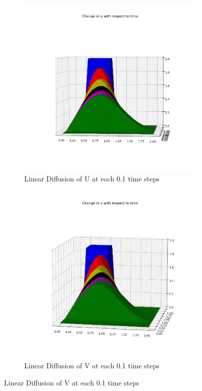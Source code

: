 \documentclass[conf]{new-aiaa}
\begin{document}
\begin{figure}[!h]
	\begin{subfigure}{0.5\textwidth}
		\centering
		\includegraphics[scale=0.35]{images/u_d.png}
		\caption{Linear Diffusion of U at each 0.1 time steps}
		\label{fig:05}
	\end{subfigure}
	\begin{subfigure}{0.5\textwidth}
		\centering
		\includegraphics[scale=0.35]{images/v_d.png}
		\caption{Linear Diffusion of V at each 0.1 time steps}
		\label{fig:06}
	\end{subfigure}
\end{figure}
\end{document}
